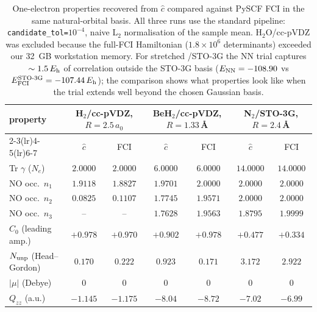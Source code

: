 \documentclass[journal=jctcce,manuscript=suppinfo,layout=traditional]{achemso}
\begin{document}
\begin{table}[t]
\caption{One-electron properties recovered from $\widehat{c}$
compared against PySCF FCI in the same natural-orbital basis. All
three runs use the standard pipeline: \texttt{candidate\_tol=$10^{-4}$},
naive L${}_2$ normalisation of the sample mean. H$_2$O/cc-pVDZ was
excluded because the full-FCI Hamiltonian ($1.8\!\times\!10^6$
determinants) exceeded our 32~GB workstation memory. For stretched
/STO-3G the NN trial captures $\sim 1.5\,E_{\rm h}$ of
correlation outside the STO-3G basis ($E_{\rm NN} = -108.90$ vs
$E_{\rm FCI}^{\rm STO\text{-}3G} = -107.44\,E_{\rm h}$); the
comparison shows what properties look like when the trial extends
well beyond the chosen Gaussian basis.}
\label{tab:rdm_properties}
\centering
\footnotesize
\begin{tabular}{lcccccc}
\toprule
property &
\multicolumn{2}{c}{H$_2$/cc-pVDZ, $R\!=\!2.5\,a_0$} &
\multicolumn{2}{c}{BeH$_2$/cc-pVDZ, $R\!=\!1.33$\,\AA} &
\multicolumn{2}{c}{N$_2$/STO-3G, $R\!=\!2.4$\,\AA} \\
\cmidrule(lr){2-3}\cmidrule(lr){4-5}\cmidrule(lr){6-7}
& $\widehat{c}$ & FCI & $\widehat{c}$ & FCI & $\widehat{c}$ & FCI \\
\midrule
Tr $\gamma$ ($N_e$)         & $2.0000$ & $2.0000$ & $6.0000$ & $6.0000$ & $14.0000$ & $14.0000$ \\
NO occ.\ $n_1$              & $1.9118$ & $1.8827$ & $1.9701$ & $2.0000$ & $2.0000$  & $2.0000$ \\
NO occ.\ $n_2$              & $0.0825$ & $0.1107$ & $1.7745$ & $1.9571$ & $2.0000$  & $2.0000$ \\
NO occ.\ $n_3$              & --       & --       & $1.7628$ & $1.9563$ & $1.8795$  & $1.9999$ \\
$C_0$ (leading amp.)        & $+0.978$ & $+0.970$ & $+0.902$ & $+0.978$ & $+0.477$  & $+0.334$ \\
$N_{\rm unp}$ (Head--Gordon)& $0.170$  & $0.222$  & $0.923$  & $0.171$  & $3.172$   & $2.922$  \\
$|\mu|$ (Debye)             & $0$      & $0$      & $0$      & $0$      & $0$       & $0$ \\
$Q_{zz}$ (a.u.)             & $-1.145$ & $-1.175$ & $-8.04$  & $-8.72$  & $-7.02$   & $-6.99$ \\
\bottomrule
\end{tabular}
\end{table}
\end{document}
